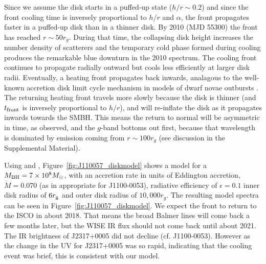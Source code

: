 \documentclass{nature}
\begin{document}
Since we assume the disk starts in a puffed-up state ($h/r \sim 0.2$)
and since the front cooling time is inversely proportional to $h/r$
and $\alpha$, the front propagates faster in a puffed-up disk than in
a thinner disk. By 2010 (MJD 55300) the front has reached $r\sim50
r_{g}$. During that time, the collapsing disk height increases the
number density of scatterers and the temporary cold phase formed
during cooling produces the remarkable blue downturn in the 2010
spectrum. The cooling front continues to propagate radially outward
but cools less efficiently at larger disk radii. Eventually, a heating
front propagates back inwards, analagous to the well-known accretion
disk limit cycle mechanism in models of dwarf novae outbursts
\cite[e.g., ][]{Cannizzo1998}. The returning heating front travels
more slowly because the disk is thinner (and $t_{\rm front}$ is
inversely proportional to $h/r$), and will re-inflate the disk as it
propagates inwards towards the SMBH. This means the return to normal
will be asymmetric in time, as observed, and the $g$-band bottoms out
first, because that wavelength is dominated by emission coming from
$r\sim100r_{g}$ (see discussion in the Supplemental Material).

Using \cite{Ford2018} and \cite{Sirko_Goodman2003},
Figure~\ref{fig:J110057_diskmodel} shows a model for a $M_{\rm
BH}=7\times 10^{8} M_{\odot}$, with an accretion rate in units of
Eddington accretion, $\dot{M}=0.070$ (as in appropriate for
J1100-0053), radiative efficiency of $\epsilon=0.1$ inner disk radius
of $6r_{\rm g}$ and outer disk radius of $10,000 r_{g}$. The resulting
model spectra can be seen in Figure~\ref{fig:J110057_diskmodel}.  We
expect the front to return to the ISCO in about 2018. That means the
broad Balmer lines will come back a few months later, but the WISE IR
flux should not come back until about 2021. The IR brightness of
J2317+0005 did not decline (cf. J1100-0053). However as the change in
the UV for J2317+0005 was so rapid, indicating that the cooling event
was brief, this is consistent with our model.
\end{document}
